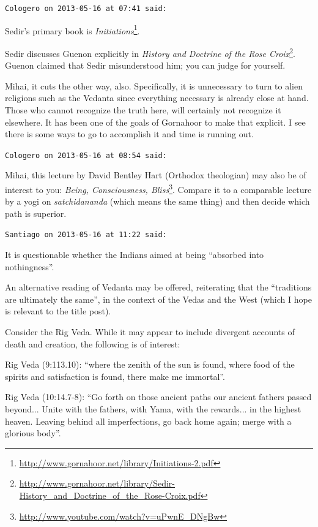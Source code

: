 \begin{footnotesize}
\begin{sffamily}
\hfill

\texttt{Cologero on 2013-05-16 at 07:41 said:}

Sedir's primary book is \textit{Initiations}\footnote{\url{http://www.gornahoor.net/library/Initiations-2.pdf}}.

Sedir discusses Guenon explicitly in \textit{History and Doctrine of the Rose Croix}\footnote{\url{http://www.gornahoor.net/library/Sedir-History_and_Doctrine_of_the_Rose-Croix.pdf}}. Guenon claimed that Sedir misunderstood him; you can judge for yourself.

Mihai, it cuts the other way, also. Specifically, it is unnecessary to turn to alien religions such as the Vedanta since everything necessary is already close at hand. Those who cannot recognize the truth here, will certainly not recognize it elsewhere. It has been one of the goals of Gornahoor to make that explicit. I see there is some ways to go to accomplish it and time is running out.

\hfill

\texttt{Cologero on 2013-05-16 at 08:54 said:}

Mihai, this lecture by David Bentley Hart (Orthodox theologian) may also be of interest to you: \textit{Being, Consciousness, Bliss}\footnote{\url{http://www.youtube.com/watch?v=uPwnE_DNgBw}}. Compare it to a comparable lecture by a yogi on \emph{satchidananda} (which means the same thing) and then decide which path is superior.

\hfill

\texttt{Santiago on 2013-05-16 at 11:22 said:}

It is questionable whether the Indians aimed at being ``absorbed into nothingness''.

An alternative reading of Vedanta may be offered, reiterating that the ``traditions are ultimately the same'', in the context of the Vedas and the West (which I hope is relevant to the title post).

Consider the Rig Veda. While it may appear to include divergent accounts of death and creation, the following is of interest:

Rig Veda (9:113.10): ``where the zenith of the sun is found, where food of the spirits and satisfaction is found, there make me immortal''.

Rig Veda (10:14.7-8): ``Go forth on those ancient paths our ancient fathers passed beyond... Unite with the fathers, with Yama, with the rewards... in the highest heaven. Leaving behind all imperfections, go back home again; merge with a glorious body''.


\end{sffamily}
\end{footnotesize}
